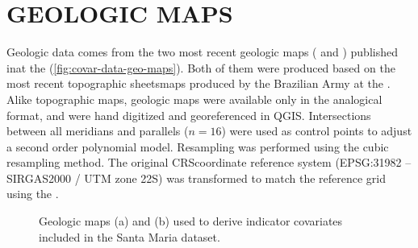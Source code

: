\section{GEOLOGIC MAPS}
\label{sec:covar-data-geo-maps}

Geologic data comes from the two most recent geologic maps (\geoOld{} and \geoNew{}) published inat the 
 \cite{GasparettoEtAl1988, MacielFilho1990} (\autoref{fig:covar-data-geo-maps}). Both of 
them were produced based on the most recent topographic sheetsmaps produced by the Brazilian Army at the 
 \cite{DSG1980, DSG1992, DSG1992a}. Alike topographic maps, geologic maps were 
available only in the analogical format, and were hand digitized and georeferenced in QGIS. Intersections 
between all meridians and parallels ($n = 16$) were used as control points to adjust a second order polynomial 
model. Resampling was performed using the cubic resampling method. The original CRScoordinate reference system 
(EPSG:31982 -- SIRGAS2000 / UTM zone 22S) was transformed to match the reference grid using the 
 \cite{BivandEtAl2013a}.

\begin{figure}[!ht]
\caption{Geologic maps (a) \geoOld{} and (b) \geoNew{} used to derive indicator covariates included in the 
Santa Maria dataset.}
\label{fig:covar-data-geo-maps}
\end{figure}

